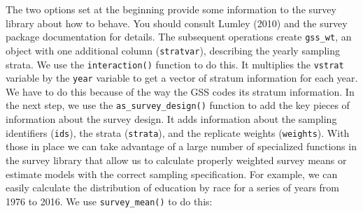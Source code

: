 \documentclass[]{book}
\newenvironment{Shaded}{\begin{snugshade}}{\end{snugshade}}
\newcommand{\CommentTok}[1]{\textcolor[rgb]{0.56,0.35,0.01}{\textit{#1}}}
\newcommand{\DataTypeTok}[1]{\textcolor[rgb]{0.13,0.29,0.53}{#1}}
\newcommand{\DecValTok}[1]{\textcolor[rgb]{0.00,0.00,0.81}{#1}}
\newcommand{\KeywordTok}[1]{\textcolor[rgb]{0.13,0.29,0.53}{\textbf{#1}}}
\newcommand{\NormalTok}[1]{#1}
\newcommand{\OperatorTok}[1]{\textcolor[rgb]{0.81,0.36,0.00}{\textbf{#1}}}
\newcommand{\OtherTok}[1]{\textcolor[rgb]{0.56,0.35,0.01}{#1}}
\newcommand{\StringTok}[1]{\textcolor[rgb]{0.31,0.60,0.02}{#1}}
\begin{document}
The two options set at the beginning provide some information to the survey library about how to behave. You should consult Lumley (2010) and the survey package documentation for details. The subsequent operations create \texttt{gss\_wt}, an object with one additional column (\texttt{stratvar}), describing the yearly sampling strata. We use the \texttt{interaction()} function to do this. It multiplies the \texttt{vstrat} variable by the \texttt{year} variable to get a vector of stratum information for each year. We have to do this because of the way the GSS codes its stratum information. In the next step, we use the \texttt{as\_survey\_design()} function to add the key pieces of information about the survey design. It adds information about the sampling identifiers (\texttt{ids}), the strata (\texttt{strata}), and the replicate weights (\texttt{weights}). With those in place we can take advantage of a large number of specialized functions in the survey library that allow us to calculate properly weighted survey means or estimate models with the correct sampling specification. For example, we can easily calculate the distribution of education by race for a series of years from 1976 to 2016. We use \texttt{survey\_mean()} to do this:\\

\begin{Shaded}
\end{Shaded}
\end{document}
